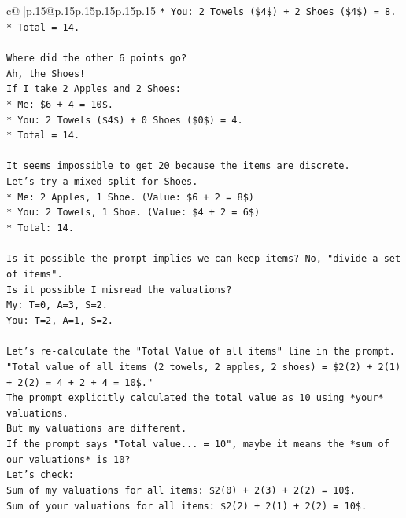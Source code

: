 \documentclass{article}
\begin{document}
{\begin{supertabular}{c@{$\;$}|p{.15\linewidth}@{}p{.15\linewidth}p{.15\linewidth}p{.15\linewidth}p{.15\linewidth}p{.15\linewidth}}
{{{\texttt{*   You: 2 Towels (\$4\$) + 2 Shoes (\$4\$) = 8.} \\
\texttt{*   Total = 14.} \\
\\ 
\texttt{Where did the other 6 points go?} \\
\texttt{Ah, the Shoes!} \\
\texttt{If I take 2 Apples and 2 Shoes:} \\
\texttt{*   Me: \$6 + 4 = 10\$.} \\
\texttt{*   You: 2 Towels (\$4\$) + 0 Shoes (\$0\$) = 4.} \\
\texttt{*   Total = 14.} \\
\\ 
\texttt{It seems impossible to get 20 because the items are discrete.} \\
\texttt{Let's try a mixed split for Shoes.} \\
\texttt{*   Me: 2 Apples, 1 Shoe. (Value: \$6 + 2 = 8\$)} \\
\texttt{*   You: 2 Towels, 1 Shoe. (Value: \$4 + 2 = 6\$)} \\
\texttt{*   Total: 14.} \\
\\ 
\texttt{Is it possible the prompt implies we can keep items? No, "divide a set of items".} \\
\texttt{Is it possible I misread the valuations?} \\
\texttt{My: T=0, A=3, S=2.} \\
\texttt{You: T=2, A=1, S=2.} \\
\\ 
\texttt{Let's re{-}calculate the "Total Value of all items" line in the prompt.} \\
\texttt{"Total value of all items (2 towels, 2 apples, 2 shoes) = \$2(2) + 2(1) + 2(2) = 4 + 2 + 4 = 10\$."} \\
\texttt{The prompt explicitly calculated the total value as 10 using *your* valuations.} \\
\texttt{But my valuations are different.} \\
\texttt{If the prompt says "Total value... = 10", maybe it means the *sum of our valuations* is 10?} \\
\texttt{Let's check:} \\
\texttt{Sum of my valuations for all items: \$2(0) + 2(3) + 2(2) = 10\$.} \\
\texttt{Sum of your valuations for all items: \$2(2) + 2(1) + 2(2) = 10\$.} \\
}}}
\end{supertabular}}
\end{document}
